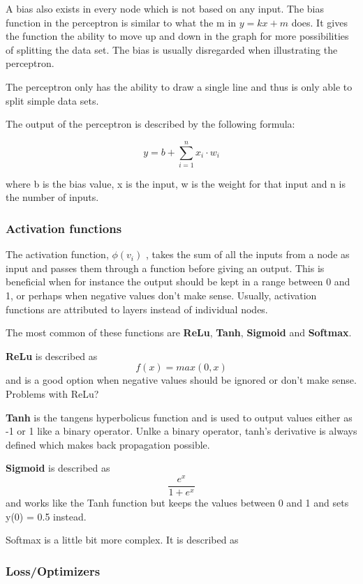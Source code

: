 A bias also exists in every node which is not based on any input. The bias function in the perceptron is similar to what the m in $y = kx + m$ does. It gives the function the ability to move up and down in the graph for more possibilities of splitting the data set. The bias is usually disregarded when illustrating the perceptron.

The perceptron only has the ability to draw a single line and thus is only able to split simple data sets.

The output of the perceptron is described by the following formula:

\[ y = b + \displaystyle\sum_{i=1}^{n} x_i \cdot w_i \]

where b is the bias value, x is the input, w is the weight for that input and n is the number of inputs.

\subsubsection{Activation functions}

The activation function,  $ \phi (v_{i}) $ , takes the sum of all the inputs from a node as input and passes them through a function before giving an output. This is beneficial when for instance the output should be kept in a range between 0 and 1, or perhaps when negative values don't make sense.
Usually, activation functions are attributed to layers instead of individual nodes.

The most common of these functions are \textbf{ReLu}, \textbf{Tanh}, \textbf{Sigmoid} and \textbf{Softmax}.

\textbf{ReLu} is described as
\[f(x) = max(0, x)\]
and is a good option when negative values should be ignored or don't make sense. Problems with ReLu?

\textbf{Tanh} is the tangens hyperbolicus function and is used to output values either as -1 or 1 like a binary operator. Unlke a binary operator, tanh's derivative is always defined which makes back propagation possible.

\textbf{Sigmoid} is described as 
\[\frac{e^x}{1+e^x}\]
and works like the Tanh function but keeps the values between 0 and 1 and sets y(0) = 0.5 instead.

Softmax is a little bit more complex. It is described as $  $

\subsubsection{Loss/Optimizers}

